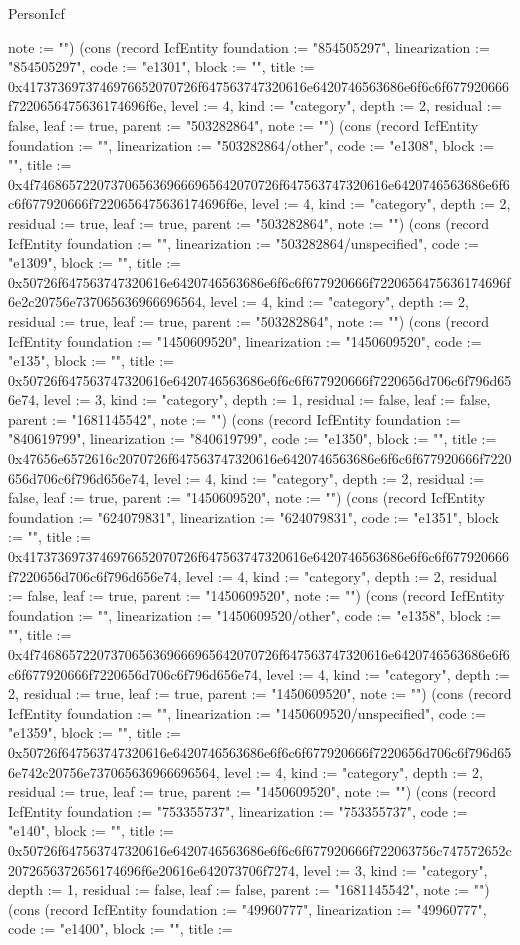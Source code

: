 \begin{lexlean}{PersonIcf}
\begin{semanticmodule}
{note := ""}) (cons (record IcfEntity {foundation := "854505297", linearization := "854505297", code := "e1301", block := "", title := 0x4173736973746976652070726f647563747320616e6420746563686e6f6c6f677920666f7220656475636174696f6e, level := 4, kind := "category", depth := 2, residual := false, leaf := true, parent := "503282864", note := ""}) (cons (record IcfEntity {foundation := "", linearization := "503282864/other", code := "e1308", block := "", title := 0x4f74686572207370656369666965642070726f647563747320616e6420746563686e6f6c6f677920666f7220656475636174696f6e, level := 4, kind := "category", depth := 2, residual := true, leaf := true, parent := "503282864", note := ""}) (cons (record IcfEntity {foundation := "", linearization := "503282864/unspecified", code := "e1309", block := "", title := 0x50726f647563747320616e6420746563686e6f6c6f677920666f7220656475636174696f6e2c20756e737065636966696564, level := 4, kind := "category", depth := 2, residual := true, leaf := true, parent := "503282864", note := ""}) (cons (record IcfEntity {foundation := "1450609520", linearization := "1450609520", code := "e135", block := "", title := 0x50726f647563747320616e6420746563686e6f6c6f677920666f7220656d706c6f796d656e74, level := 3, kind := "category", depth := 1, residual := false, leaf := false, parent := "1681145542", note := ""}) (cons (record IcfEntity {foundation := "840619799", linearization := "840619799", code := "e1350", block := "", title := 0x47656e6572616c2070726f647563747320616e6420746563686e6f6c6f677920666f7220656d706c6f796d656e74, level := 4, kind := "category", depth := 2, residual := false, leaf := true, parent := "1450609520", note := ""}) (cons (record IcfEntity {foundation := "624079831", linearization := "624079831", code := "e1351", block := "", title := 0x4173736973746976652070726f647563747320616e6420746563686e6f6c6f677920666f7220656d706c6f796d656e74, level := 4, kind := "category", depth := 2, residual := false, leaf := true, parent := "1450609520", note := ""}) (cons (record IcfEntity {foundation := "", linearization := "1450609520/other", code := "e1358", block := "", title := 0x4f74686572207370656369666965642070726f647563747320616e6420746563686e6f6c6f677920666f7220656d706c6f796d656e74, level := 4, kind := "category", depth := 2, residual := true, leaf := true, parent := "1450609520", note := ""}) (cons (record IcfEntity {foundation := "", linearization := "1450609520/unspecified", code := "e1359", block := "", title := 0x50726f647563747320616e6420746563686e6f6c6f677920666f7220656d706c6f796d656e742c20756e737065636966696564, level := 4, kind := "category", depth := 2, residual := true, leaf := true, parent := "1450609520", note := ""}) (cons (record IcfEntity {foundation := "753355737", linearization := "753355737", code := "e140", block := "", title := 0x50726f647563747320616e6420746563686e6f6c6f677920666f722063756c747572652c2072656372656174696f6e20616e642073706f7274, level := 3, kind := "category", depth := 1, residual := false, leaf := false, parent := "1681145542", note := ""}) (cons (record IcfEntity {foundation := "49960777", linearization := "49960777", code := "e1400", block := "", title := }
\end{semanticmodule}
\end{lexlean}
